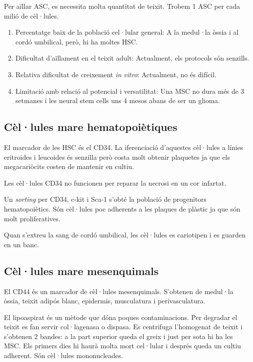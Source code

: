 Per aïllar ASC, es necessita molta quantitat de teixit. Trobem 1 ASC
per cada milió de cèl·lules.

\begin{enumerate}[\bf 1)]
\item Percentatge baix de la població cel·lular general: A la medul·la
  òssia i al cordó umbilical, però, hi ha moltes HSC.
\item Dificultat d'aïllament en el teixit adult: Actualment, els protocols són senzills.
\item Relativa dificultat de creixement \textit{in vitro}: Actualment, no és difícil.
\item Limitació amb relació al potencial i versatilitat: Una MSC no
  dura més de 3 setmanes i les neural stem cells uns 4 mesos abans de ser un glioma.
 \end{enumerate}

\subsection{Cèl·lules mare hematopoiètiques}
El marcador de les HSC és el CD34. La iferenciació d'aquestes
cèl·lules a línies eritroides i leucoides és senzilla però costa molt
obtenir plaquetes ja que els megacariòcits costen de mantenir en cultiu.

Les cèl·lules CD34 no funcionen per reparar la necrosi en un cor
infartat.

Un \textit{sorting} per CD34, c-kit i Sca-1 s'obté la població de
progenitors hematopoiètics. Són cèl·lules poc adherents a les plaques
de plàstic ja que són molt proliferatives.

Quan s'extreu la sang de cordó umbilical, les cèl·lules es cariotipen
i es guarden en un banc.

\subsection{Cèl·lules mare mesenquimals}
El CD44 és un marcador de cèl·lules mesenquimals. S'obtenen de
medul·la òssia, teixit adipós blanc, epidermis, musculatura i
perivasculatura.

El lipoaspirat és un mètode que dóna poques contaminacions. Per
degradar el teixit es fan servir col·lagenasa o dispasa. Es
centrifuga l'homogenat de teixit i s'obtenen 2 bandes: a la part
superior queda el greix i just per sota hi ha les MSC. Els primers
dies hi haurà molta mort cel·lular i després queda un cultiu
adherent. Són cèl·lules mononucleades.

